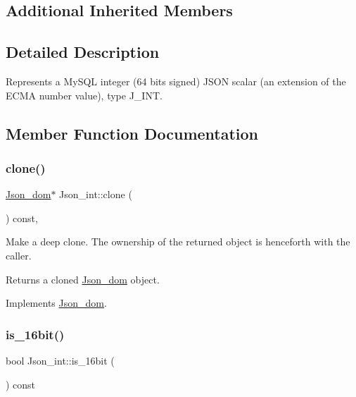 \subsection*{Additional Inherited Members}


\subsection{Detailed Description}
Represents a My\+S\+QL integer (64 bits signed) J\+S\+ON scalar (an extension of the E\+C\+MA number value), type J\+\_\+\+I\+NT. 

\subsection{Member Function Documentation}
\mbox{\label{classJson__int_abfcff916299a0bd41dd18ed1596d0444}} 
\subsubsection{\texorpdfstring{clone()}{clone()}}
{\footnotesize\ttfamily \mbox{\hyperlink{classJson__dom}{Json\+\_\+dom}}$\ast$ Json\+\_\+int\+::clone (\begin{DoxyParamCaption}{ }\end{DoxyParamCaption}) const\hspace{0.3cm}{\ttfamily [inline]}, {\ttfamily [virtual]}}

Make a deep clone. The ownership of the returned object is henceforth with the caller.

\begin{DoxyReturn}{Returns}
a cloned \mbox{\hyperlink{classJson__dom}{Json\+\_\+dom}} object. 
\end{DoxyReturn}


Implements \mbox{\hyperlink{classJson__dom_a03c529d590cc4cdb747ccb82f4b70fb5}{Json\+\_\+dom}}.

\mbox{\label{classJson__int_a1a25d3b6bce0585b2c249d3b83fb6b85}} 
\subsubsection{\texorpdfstring{is\+\_\+16bit()}{is\_16bit()}}
{\footnotesize\ttfamily bool Json\+\_\+int\+::is\+\_\+16bit (\begin{DoxyParamCaption}{ }\end{DoxyParamCaption}) const\hspace{0.3cm}{\ttfamily [inline]}}

